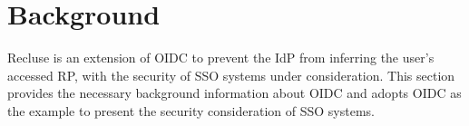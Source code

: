 \section{Background}
\label{sec:background}
Recluse is an extension of OIDC to prevent the IdP from inferring the user's accessed RP, with the security of SSO systems under consideration. This section provides the necessary background information about OIDC and adopts OIDC as the example to present the security consideration of SSO systems. 

